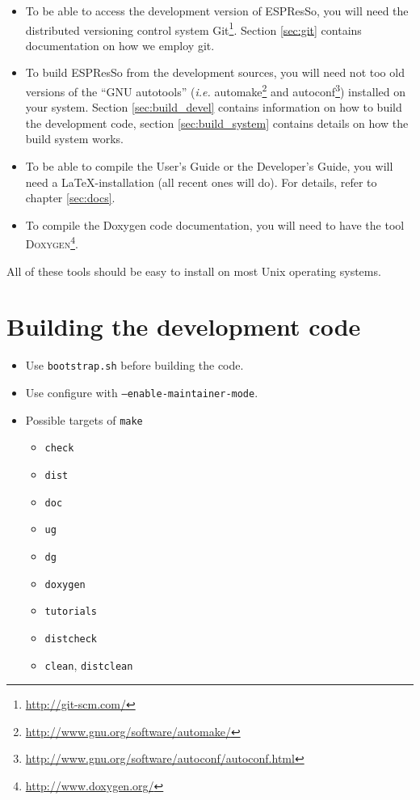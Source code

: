 \documentclass[
a4paper,                        %
11pt,                           %
twoside,                        %
footsepline,                    %
headsepline,                    %
headexclude,                    %
footexclude,                    %
pagesize,                       %
bibtotocnumbered,               %
idxtotoc                        %
]{scrreprt}
\newcommand{\es}{\mbox{\textsf{ESPResSo}}\xspace}
\newcommand{\ie}{\textit{i.e.}\xspace}
\begin{document}
\begin{itemize}
\item To be able to access the development version of \es, you will
  need the distributed versioning control system
  Git\footnote{\url{http://git-scm.com/}}.  Section \vref{sec:git}
  contains documentation on how we employ git.
\item To build \es from the development sources, you will need not too
  old versions of the ``GNU autotools'' (\ie
  automake\footnote{\url{http://www.gnu.org/software/automake/}} and
  autoconf\footnote{\url{http://www.gnu.org/software/autoconf/autoconf.html}})
  installed on your system. Section \vref{sec:build_devel} contains
  information on how to build the development code, section
  \vref{sec:build_system} contains details on how the build system
  works.
\item To be able to compile the User's Guide or the Developer's Guide,
  you will need a \LaTeX-installation (all recent ones will do). For
  details, refer to chapter \vref{sec:docs}.
\item To compile the Doxygen code documentation, you will need to have
  the tool \textsc{Doxygen}\footnote{\url{http://www.doxygen.org/}}.
\end{itemize}

All of these tools should be easy to install on most Unix operating
systems.

\section{Building the development code}
\label{sec:build_devel}

\begin{itemize}
\item Use \texttt{bootstrap.sh} before building the code.
\item Use configure with \texttt{--enable-maintainer-mode}.
\item Possible targets of \texttt{make}
  \begin{itemize}
  \item \texttt{check}
  \item \texttt{dist}
  \item \texttt{doc}
  \item \texttt{ug}
  \item \texttt{dg}
  \item \texttt{doxygen}
  \item \texttt{tutorials}
  \item \texttt{distcheck}
  \item \texttt{clean}, \texttt{distclean}
  \end{itemize}
\end{itemize}
\end{document}
